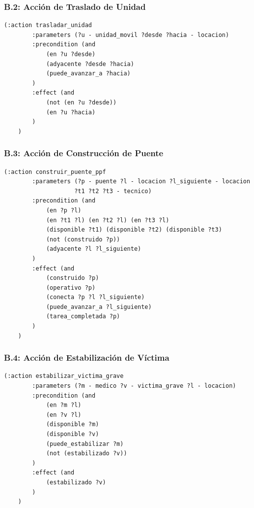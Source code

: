 \documentclass[conference]{IEEEtran}
\begin{document}
    \subsubsection*{B.2: Acción de Traslado de Unidad}

    \begin{lstlisting}[style=anexostyle,caption={Acción para trasladar unidades móviles}]
    (:action trasladar_unidad
        :parameters (?u - unidad_movil ?desde ?hacia - locacion)
        :precondition (and
            (en ?u ?desde)
            (adyacente ?desde ?hacia)
            (puede_avanzar_a ?hacia)
        )
        :effect (and
            (not (en ?u ?desde))
            (en ?u ?hacia)
        )
    )
    \end{lstlisting}

    \subsubsection*{B.3: Acción de Construcción de Puente}

    \begin{lstlisting}[style=anexostyle,caption={Acción para construir puente prefabricado}]
    (:action construir_puente_ppf
        :parameters (?p - puente ?l - locacion ?l_siguiente - locacion
                    ?t1 ?t2 ?t3 - tecnico)
        :precondition (and
            (en ?p ?l)
            (en ?t1 ?l) (en ?t2 ?l) (en ?t3 ?l)
            (disponible ?t1) (disponible ?t2) (disponible ?t3)
            (not (construido ?p))
            (adyacente ?l ?l_siguiente)
        )
        :effect (and
            (construido ?p)
            (operativo ?p)
            (conecta ?p ?l ?l_siguiente)
            (puede_avanzar_a ?l_siguiente)
            (tarea_completada ?p)
        )
    )
    \end{lstlisting}

    \subsubsection*{B.4: Acción de Estabilización de Víctima}

    \begin{lstlisting}[style=anexostyle,caption={Acción para estabilizar víctima grave}]
    (:action estabilizar_victima_grave
        :parameters (?m - medico ?v - victima_grave ?l - locacion)
        :precondition (and
            (en ?m ?l)
            (en ?v ?l)
            (disponible ?m)
            (disponible ?v)
            (puede_estabilizar ?m)
            (not (estabilizado ?v))
        )
        :effect (and
            (estabilizado ?v)
        )
    )
    \end{lstlisting}
\end{document}
